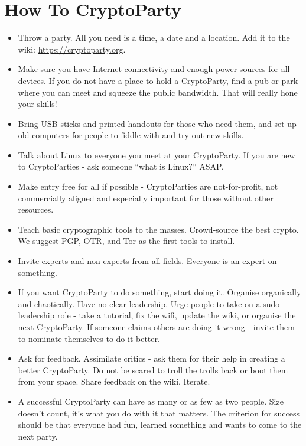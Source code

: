 \section{How To CryptoParty}

\begin{itemize}
\item
  Throw a party. All you need is a time, a date and a location. Add it
  to the wiki: \href{https://cryptoparty.org}{https://cryptoparty.org}.
\item
  Make sure you have Internet connectivity and enough power sources for
  all devices. If you do not have a place to hold a CryptoParty, find a
  pub or park where you can meet and squeeze the public bandwidth. That
  will really hone your skills!
\item
  Bring USB sticks and printed handouts for those who need them, and set
  up old computers for people to fiddle with and try out new skills.
\item
  Talk about Linux to everyone you meet at your CryptoParty. If you are
  new to CryptoParties - ask someone ``what is Linux?'' ASAP.
\item
  Make entry free for all if possible - CryptoParties are
  not-for-profit, not commercially aligned and especially important for
  those without other resources.
\item
  Teach basic cryptographic tools to the masses. Crowd-source the best
  crypto. We suggest PGP, OTR, and Tor as the first tools to install.
\item
  Invite experts and non-experts from all fields. Everyone is an expert
  on something.
\item
  If you want CryptoParty to do something, start doing it. Organise
  organically and chaotically. Have no clear leadership. Urge people to
  take on a sudo leadership role - take a tutorial, fix the wifi, update
  the wiki, or organise the next CryptoParty. If someone claims others
  are doing it wrong - invite them to nominate themselves to do it
  better.
\item
  Ask for feedback. Assimilate critics - ask them for their help in
  creating a better CryptoParty. Do not be scared to troll the trolls
  back or boot them from your space. Share feedback on the wiki.
  Iterate.
\item
  A successful CryptoParty can have as many or as few as two people.
  Size doesn't count, it's what you do with it that matters. The
  criterion for success should be that everyone had fun, learned
  something and wants to come to the next party.

\end{itemize}

